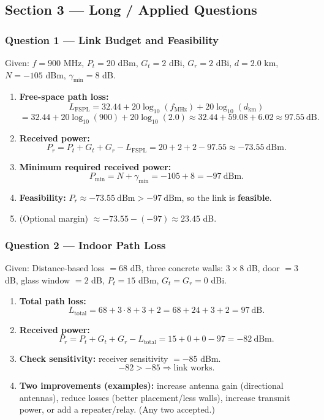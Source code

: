 \documentclass[11pt,a4paper]{article}
\begin{document}
\subsection*{Section 3 --- Long / Applied Questions}

\subsubsection*{Question 1 --- Link Budget and Feasibility}
Given:
$f=900$ MHz, $P_t=20$ dBm, $G_t=2$ dBi, $G_r=2$ dBi, $d=2.0$ km,
$N=-105$ dBm, $\gamma_{\min}=8$ dB.

\begin{enumerate}[label=\alph*.]
    \item \textbf{Free-space path loss:}
    \[
    L_{\mathrm{FSPL}} = 32.44 + 20\log_{10}(f_{\mathrm{MHz}}) + 20\log_{10}(d_{\mathrm{km}})
    \]
    \[
    = 32.44 + 20\log_{10}(900) + 20\log_{10}(2.0)
    \approx 32.44 + 59.08 + 6.02
    \approx 97.55\ \mathrm{dB}.
    \]

    \item \textbf{Received power:}
    \[
    P_r = P_t + G_t + G_r - L_{\mathrm{FSPL}}
    = 20 + 2 + 2 - 97.55
    \approx -73.55\ \mathrm{dBm}.
    \]

    \item \textbf{Minimum required received power:}
    \[
    P_{\min} = N + \gamma_{\min} = -105 + 8 = -97\ \mathrm{dBm}.
    \]

    \item \textbf{Feasibility:} $P_r \approx -73.55\ \mathrm{dBm} > -97\ \mathrm{dBm}$, so the link is \textbf{feasible}.
    \item (Optional margin) $\approx -73.55 - (-97) \approx 23.45$ dB.
    
\end{enumerate}

\subsubsection*{Question 2 --- Indoor Path Loss}
Given:
Distance-based loss $=68$ dB,
three concrete walls: $3\times 8$ dB,
door $=3$ dB,
glass window $=2$ dB,
$P_t=15$ dBm, $G_t=G_r=0$ dBi.

\begin{enumerate}[label=\alph*.]
    \item \textbf{Total path loss:}
    \[
    L_{\text{total}} = 68 + 3\cdot 8 + 3 + 2 = 68+24+3+2=97\ \mathrm{dB}.
    \]
    \item \textbf{Received power:}
    \[
    P_r = P_t + G_t + G_r - L_{\text{total}} = 15 + 0 + 0 - 97 = -82\ \mathrm{dBm}.
    \]
    \item \textbf{Check sensitivity:} receiver sensitivity $=-85$ dBm.
    \[
    -82 > -85 \Rightarrow \text{link works.}
    \]
    \item \textbf{Two improvements (examples):} increase antenna gain (directional antennas), reduce losses (better placement/less walls), increase transmit power, or add a repeater/relay. (Any two accepted.)
\end{enumerate}
\end{document}
